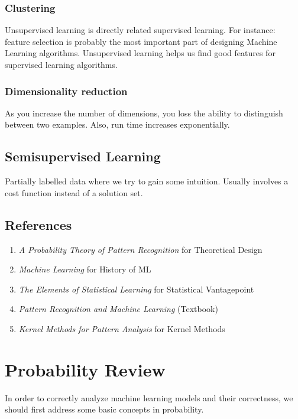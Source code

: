 \documentclass[12pt]{article}
\begin{document}
\subsubsection{Clustering}

Unsupervised learning is directly related supervised learning. For instance: feature selection is probably the most important part of designing Machine Learning algorithms. Unsupervised learning helps us find good features for supervised learning algorithms. \\

\subsubsection{Dimensionality reduction}

As you increase the number of dimensions, you loss the ability to distinguish between two examples. Also, run time increases exponentially.

\subsection{Semisupervised Learning}

Partially labelled data where we try to gain some intuition. Usually involves a cost function instead of a solution set.


\subsection{References}

\begin{enumerate}[noitemsep]
\item \textit{A Probability Theory of Pattern Recognition} for Theoretical Design
\item \textit{Machine Learning} for History of ML
\item \textit{The Elements of Statistical Learning} for Statistical Vantagepoint
\item \textit{Pattern Recognition and Machine Learning} (Textbook)
\item \textit{Kernel Methods for Pattern Analysis} for Kernel Methods
\end{enumerate}

\section{Probability Review}

In order to correctly analyze machine learning models and their correctness, we should first address some basic concepts in probability.
\\
\end{document}
